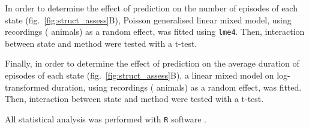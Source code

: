 In order to determine the effect of prediction on the number of episodes of each state (fig.~\ref{fig:struct_assess}B),
Poisson generalised linear mixed model, using recordings (\ie{} animals) as a
random effect, was fitted using \texttt{lme4}\cite{bates_lme4:_2014}.
Then, interaction between state and method were tested with a t-test.

Finally, in order to determine the effect of prediction on the average duration of episodes of each state (fig.~\ref{fig:struct_assess}B),
a linear mixed model on log-transformed duration, using recordings (\ie{} animals) as a random effect, was fitted. 
Then, interaction between state and method were tested with a t-test.

All statistical analysis was performed with \texttt{R} software \cite{r_core_team_r:_2014}.
